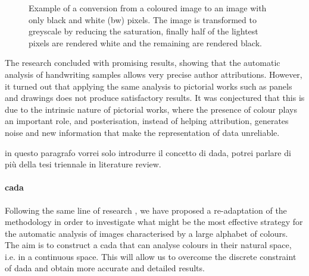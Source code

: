 \begin{figure}[ht]
\begin{subfigure}{0.4\linewidth}
	\end{subfigure}
	\caption[Example of conversion from RGB to BW]{Example of a conversion from a coloured image to an image with only black and white (bw) pixels. The image is transformed to greyscale by reducing the saturation, finally half of the lightest pixels are rendered white and the remaining are rendered black.}
	\label{fig:example_bw}
\end{figure}

\noindent The research concluded with promising results, showing that the automatic analysis of handwriting samples allows very precise author attributions. However, it turned out that applying the same analysis to pictorial works such as panels and drawings does not produce satisfactory results. It was conjectured that this is due to the intrinsic nature of pictorial works, where the presence of colour plays an important role, and posterisation, instead of helping attribution, generates noise and new information that make the representation of data unreliable.

\begin{note} in questo paragrafo vorrei solo introdurre il concetto di \gls{dada}, potrei parlare di più della tesi triennale in literature review. \end{note}

\paragraph{\gls{cada}}
Following the same line of research \cite[my bachelor thesis]{thesis}, we have proposed a re-adaptation of the methodology in order to investigate what might be the most effective strategy for the automatic analysis of images characterised by a large alphabet of colours. The aim is to construct a \gls{cada} that can analyse colours in their natural space, i.e. in a continuous space. This will allow us to overcome the discrete constraint of \gls{dada} and obtain more accurate and detailed results.

